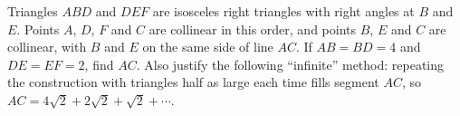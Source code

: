 Triangles $ABD$ and $DEF$ are isosceles right triangles with right angles at $B$ and $E$. Points $A$, $D$, $F$ and $C$ are collinear in this order, and points $B$, $E$ and $C$ are collinear, with $B$ and $E$ on the same side of line $AC$. If $AB=BD=4$ and $DE=EF=2$, find $AC$. Also justify the following ``infinite'' method: repeating the construction with triangles half as large each time fills segment $AC$, so $AC=4\sqrt2+2\sqrt2+\sqrt2+\cdots$.
